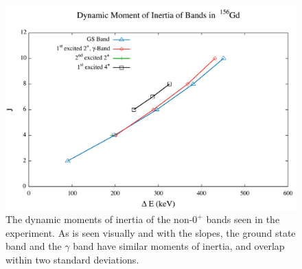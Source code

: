\begin{figure}[!]
    \centering
    \includegraphics[scale=0.45]{Discussion/156_Dynamic.pdf}
    \caption{The dynamic moments of inertia of the non-$0^+$ bands seen in the experiment. As is seen visually and with the slopes, the ground state band and the $\gamma$ band have similar moments of inertia, and overlap within two standard deviations.}
    \label{fig:156_Dynamic}
\end{figure}